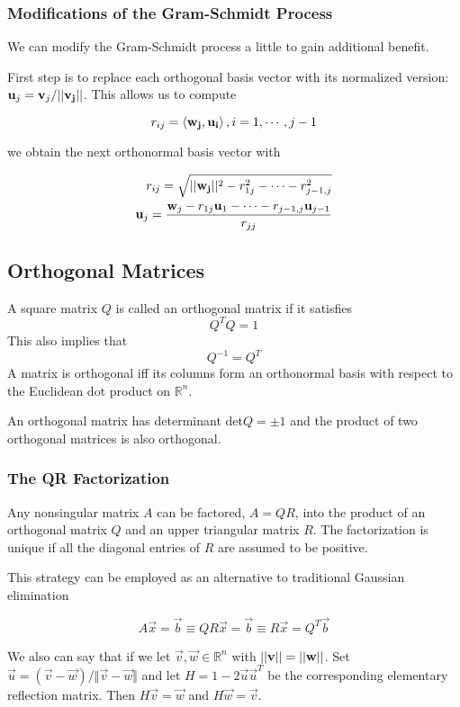         \subsubsection{Modifications of the Gram-Schmidt Process}
        We can modify the Gram-Schmidt process a little to gain additional benefit.

        First step is to replace each orthogonal basis vector with its normalized version: $\mathbf{u}_j = \mathbf{v}_j / \lvert \lvert \mathbf{v_j} \rvert \rvert$. This allows us to compute

            \[ r_{ij} = \left\langle \mathbf{w_j}, \mathbf{u_i} \right\rangle, i = 1, \cdots, j - 1 \]

        we obtain the next orthonormal basis vector with

            \[ \begin{aligned}
                    r_{ij} = \sqrt{\lvert \lvert \mathbf{w_j} \rvert \rvert^2 - r^2_{1j} - \cdots - r^2_{j-1,j} }\\
                    \mathbf{u}_j = \frac{\mathbf{w}_j - r_{1j}\mathbf{u}_1 - \cdots - r_{j-1, j}\mathbf{u}_{j-1} }{r_{jj} }
                \end{aligned} \]

    \subsection{Orthogonal Matrices}
    A square matrix $Q$ is called an orthogonal matrix if it satisfies
        \[ Q^T Q = 1 \]
    This also implies that
        \[ Q^{-1} = Q^T \]
    A matrix is orthogonal iff its columns form an orthonormal basis with respect to the Euclidean dot product on $\mathbb{R}^n$.

    An orthogonal matrix has determinant det$Q = \pm 1$ and the product of two orthogonal matrices is also orthogonal.

        \subsubsection{The QR Factorization}
        Any nonsingular matrix $A$ can be factored, $A = QR$, into the product of an orthogonal matrix $Q$ and an upper triangular matrix $R$. The factorization is unique if all the diagonal entries of $R$ are assumed to be positive.

        This strategy can be employed as an alternative to traditional Gaussian elimination

        \[ A\vec{x} = \vec{b} \equiv QR\vec{x} = \vec{b} \equiv R\vec{x} = Q^T \vec{b} \]

        We also can say that if we let $\vec{v}, \vec{w} \in \mathbb{R}^n$ with $\lvert \lvert \mathbf{v} \rvert \rvert = \lvert \lvert \mathbf{w} \rvert \rvert$. Set $\vec{u} = (\vec{v} - \vec{w}) / \Vert \vec{v} - \vec{w} \Vert$ and let $H = 1 - 2\vec{u}\vec{u}^T$ be the corresponding elementary reflection matrix. Then $H\vec{v} = \vec{w}$ and $H \vec{w} = \vec{v}$.

